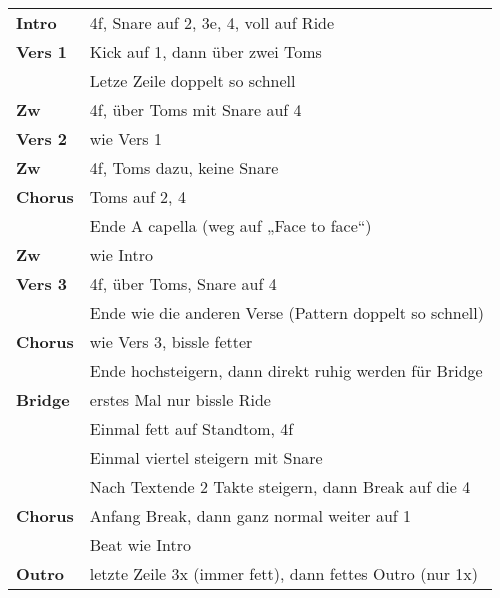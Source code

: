 
\begin{tabular}{p{1.6cm}l}
	\textbf{Intro}  & 4f, Snare auf 2, 3e, 4, voll auf Ride                    \\
	\textbf{Vers 1} & Kick auf 1, dann über zwei Toms                          \\
	                & Letze Zeile doppelt so schnell                           \\
	\textbf{Zw}     & 4f, über Toms mit Snare auf 4                            \\
	\textbf{Vers 2} & wie Vers 1                                               \\
	\textbf{Zw}     & 4f, Toms dazu, keine Snare                               \\
	\textbf{Chorus} & Toms auf 2, 4                                            \\
	                & Ende A capella (weg auf „Face to face“)                  \\
	\textbf{Zw}     & wie Intro                                                \\
	\textbf{Vers 3} & 4f, über Toms, Snare auf 4                               \\
	                & Ende wie die anderen Verse (Pattern doppelt so schnell)  \\
	\textbf{Chorus} & wie Vers 3, bissle fetter                                \\
	                & Ende hochsteigern, dann direkt ruhig werden für Bridge   \\
	\textbf{Bridge} & erstes Mal nur bissle Ride                               \\
	                & Einmal fett auf Standtom, 4f                             \\
	                & Einmal viertel steigern mit Snare                        \\
	                & Nach Textende 2 Takte steigern, dann Break auf die 4     \\
	\textbf{Chorus} & Anfang Break, dann ganz normal weiter auf 1              \\
	                & Beat wie Intro                                           \\
	\textbf{Outro}  & letzte Zeile 3x (immer fett), dann fettes Outro (nur 1x) \\
\end{tabular}
